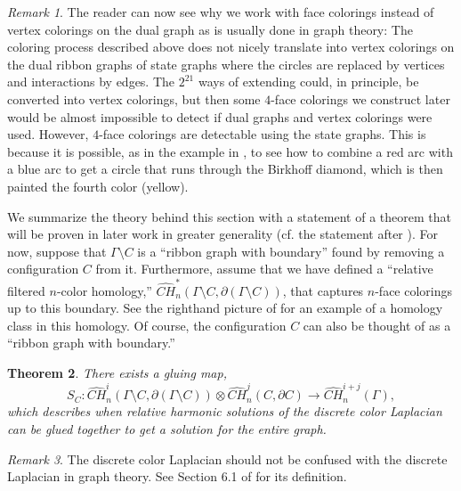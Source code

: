 \documentclass[12pt]{amsart}
\newtheorem{theorem}{Theorem}[section]
\theoremstyle{definition}
\theoremstyle{remark}
\newtheorem{remark}[theorem]{Remark}
\numberwithin{equation}{section}
\newcommand{\ot}{\otimes}
\newcommand{\ra}{\rightarrow}
\def\del{\partial}
\def\del{\partial}
\begin{document}
\begin{remark} \label{remark:face-vs-vertex-colorings} The reader can now see why we work with  face colorings instead of vertex colorings on the dual graph as is usually done in graph theory: The coloring process described above does not nicely translate into vertex colorings on the dual ribbon graphs of state graphs where the circles are replaced by vertices and interactions by edges. The $2^{21}$ ways of extending could, in principle, be converted into vertex colorings, but then some $4$-face colorings we construct later would be almost impossible to detect if dual graphs and vertex colorings were used. However, $4$-face colorings are  detectable using the state graphs. This is because it is possible, as in the example in  , to see how to combine a red arc with a blue arc to get a circle that runs through the Birkhoff diamond, which is then painted the fourth color (yellow).
\end{remark}

We summarize the theory behind this section with a statement of a theorem that will be proven in later work in greater generality (cf. the statement after ). For now, suppose that $\Gamma\setminus C$ is a ``ribbon graph with boundary'' found by removing a configuration $C$ from it.  Furthermore, assume that we have defined a ``relative filtered $n$-color homology,'' $\widehat{CH}_n^*(\Gamma\setminus C,\del (\Gamma\setminus C))$, that captures $n$-face colorings up to this boundary.  See the righthand picture of  for an example of a homology class in this homology. Of course, the configuration $C$ can also be thought of as  a ``ribbon graph with boundary.'' 

\begin{theorem} There exists a gluing map,
$$S_C:\widehat{CH}_n^i(\Gamma\setminus C,\del (\Gamma\setminus C)) \ot \widehat{CH}_n^j(C,\del C) \ra \widehat{CH}_n^{i+j}(\Gamma),$$
which describes when relative harmonic solutions of the discrete color Laplacian can be glued together to get a solution for the entire graph.
\label{theorem:gluing-map}
\end{theorem}

\begin{remark}The discrete color Laplacian should not be confused with the discrete Laplacian in graph theory. See Section 6.1 of \cite{BMcC} for its definition.
\end{remark} 
\end{document}
